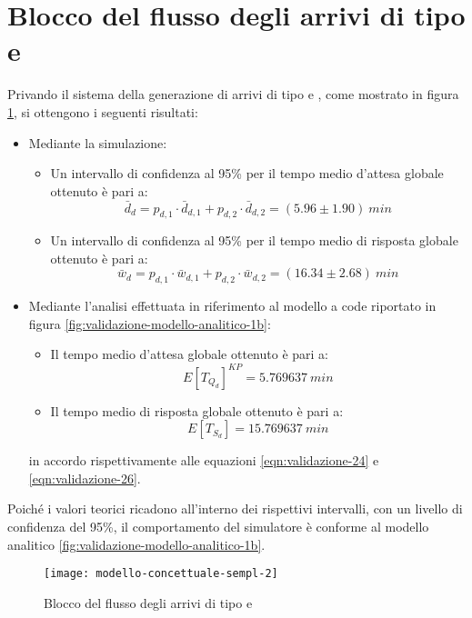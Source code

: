 \section{Blocco del flusso degli arrivi di tipo \uo{} e \pp{}}\label{sec:validazione-blocco-uo-pp}
Privando il sistema della generazione di arrivi di tipo \uo{} e \pp{}, come mostrato in figura \ref{fig:validazione-semplificazione-2}, si ottengono i seguenti risultati:
\begin{itemize}
\item Mediante la simulazione:
\begin{itemize}
\item Un intervallo di confidenza al 95\% per il tempo medio d'attesa globale ottenuto è pari a:
\begin{equation} 
\bar{d}_d = p_{d,1}\cdot \bar{d}_{d,1} + p_{d,2}\cdot \bar{d}_{d,2} = (5.96 \pm 1.90)\ min
\end{equation}
\item Un intervallo di confidenza al 95\% per il tempo medio di risposta globale ottenuto è pari a:
\begin{equation}
\bar{w}_d = p_{d,1}\cdot \bar{w}_{d,1} + p_{d,2}\cdot \bar{w}_{d,2} = (16.34 \pm 2.68)\ min
\end{equation}
\end{itemize}

\item Mediante l'analisi effettuata in riferimento al modello a code riportato in figura \ref{fig:validazione-modello-analitico-1b}:
\begin{itemize}
\item Il tempo medio d'attesa globale ottenuto è pari a:
\begin{equation}
E[T_{Q_d}]^{KP} = 5.769637\ min 
\end{equation}
\item Il tempo medio di risposta globale ottenuto è pari a:
\begin{equation}
E[T_{S_d}] = 15.769637\ min 
\end{equation}
\end{itemize}
in accordo rispettivamente alle equazioni \ref{eqn:validazione-24} e \ref{eqn:validazione-26}.
\end{itemize}

Poiché i valori teorici ricadono all'interno dei rispettivi intervalli, con un livello di confidenza del 95\%, il comportamento del simulatore è conforme al modello analitico \ref{fig:validazione-modello-analitico-1b}.

\begin{figure}[ht]
\centering
\texttt{[image: modello-concettuale-sempl-2]}
\caption{Blocco del flusso degli arrivi di tipo \uo{} e \pp{}}
\label{fig:validazione-semplificazione-2}
\end{figure}
